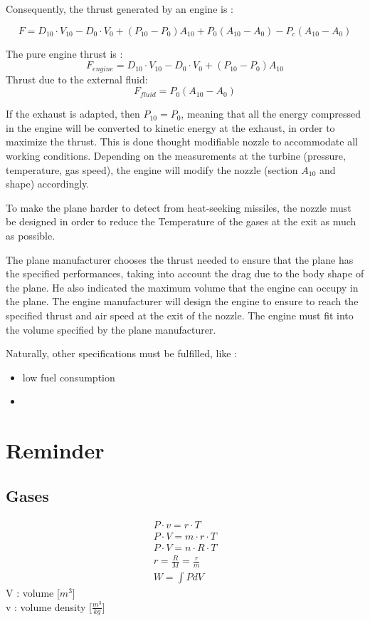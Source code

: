 \documentclass[12pt,a4paper]{article}
\begin{document}
	Consequently, the thrust generated by an engine is : 
	
	\begin{dmath}
		F = D_{10} \cdot V_{10} - D_{0} \cdot V_{0} + (P_{10} - P_0) A_{10} + P_0 (A_{10} -A_0) -  P_c (A_{10} - A_0)
	\end{dmath}
	
	The pure engine thrust is : 
	\begin{dmath}
		F_{engine} = D_{10} \cdot V_{10} - D_{0} \cdot V_{0} + (P_{10} - P_0) A_{10}
	\end{dmath}
	Thrust due to the external fluid:  
	\begin{dmath}
		F_{fluid} = P_0 (A_{10} -A_0)
	\end{dmath}
	
	If the exhaust is adapted, then $P_{10} = P_0$, meaning that all the energy compressed in the engine will be converted to kinetic energy at the exhaust, in order to maximize the thrust. This is done thought modifiable nozzle to accommodate all working conditions. Depending on the measurements at the turbine (pressure, temperature, gas speed), the engine will modify the nozzle (section $A_{10}$ and shape) accordingly. 
	
	To make the plane harder to detect from heat-seeking missiles, the nozzle must be designed in order to reduce the Temperature of the gases at the exit as much as possible. 
	
	The plane manufacturer chooses the thrust needed to ensure that the plane has the specified performances, taking into account the drag due to the body shape of the plane. He also indicated the maximum volume that the engine can occupy in the plane.
	The engine manufacturer will design the engine to ensure to reach the specified thrust and air speed at the exit of the nozzle. The engine must fit into the volume specified by the plane manufacturer. 
	
	Naturally, other specifications must be fulfilled, like :
	\begin{itemize}
		\item low fuel consumption
		\item 
	\end{itemize}
	
	\newpage
	
	\section{Reminder}
	\subsection{Gases}
	\begin{eqnarray}
		P \cdot v= r \cdot T\\
		P \cdot V= m \cdot r \cdot T\\
		P \cdot V= n \cdot R \cdot T\\
		r = \frac{R}{M} = \frac{r}{m}\\
		W =\int P dV
	\end{eqnarray}
	V : volume [$m^3$] \\
	v : volume density [$\frac{m^3}{kg}$]
	
\end{document}
